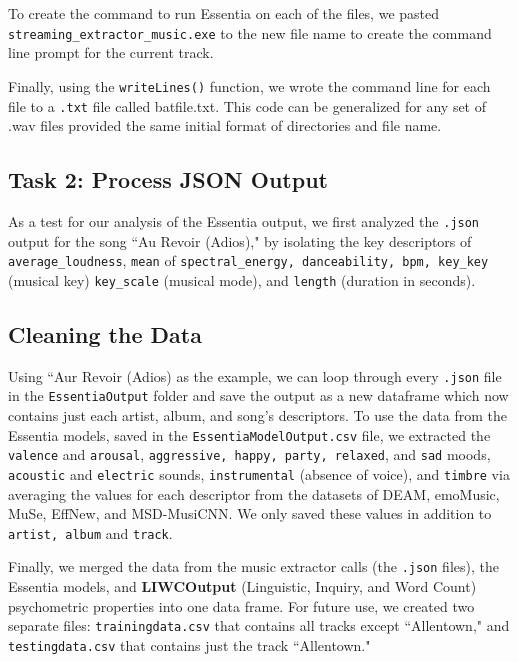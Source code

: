 \documentclass{article}\usepackage[]{graphicx}\usepackage[]{xcolor}
\begin{document}
\begin{multicols}{2}
  
  To create the command to run Essentia on each of the files, we pasted \texttt{streaming\_extractor\_music.exe} to the new file name to create the command line prompt for the current track.







Finally, using the \texttt{writeLines()} function, we wrote the command line for each file to a \texttt{.txt} file called batfile.txt. This code can be generalized for any set of .wav files provided the same initial format of directories and file name.










\subsection{Task 2: Process JSON Output}
As a test for our analysis of the Essentia output, we first analyzed the \texttt{.json} output for the song ``Au Revoir (Adios)," by isolating the key descriptors of \texttt{average\_loudness}, \texttt{mean} of \texttt{spectral\_energy, danceability, bpm, key\_key} (musical key) \texttt{key\_scale} (musical mode), and \texttt{length} (duration in seconds). 

\subsection{Cleaning the Data}
  Using ``Aur Revoir (Adios) as the example, we can loop through every \texttt{.json} file in the \texttt{EssentiaOutput} folder and save the output as a new dataframe which now contains just each artist, album, and song's descriptors. 
  To use the data from the Essentia models, saved in the \texttt{EssentiaModelOutput.csv} file, we extracted the \texttt{valence} and \texttt{arousal}, \texttt{aggressive, happy, party, relaxed}, and \texttt{sad} moods, \texttt{acoustic} and \texttt{electric} sounds, \texttt{instrumental} (absence of voice), and \texttt{timbre} via averaging the values for each descriptor from the datasets of DEAM, emoMusic, MuSe, EffNew, and MSD-MusiCNN. We only saved these values in addition to \texttt{artist, album} and \texttt{track}.
  
  Finally, we merged the data from the music extractor calls (the \texttt{.json} files), the Essentia models, and \textbf{LIWCOutput} (Linguistic, Inquiry, and Word Count) psychometric properties into one data frame. For future use, we created two separate files: \texttt{trainingdata.csv} that contains all tracks except ``Allentown," and \texttt{testingdata.csv} that contains just the track ``Allentown."



\end{multicols}
\end{document}

